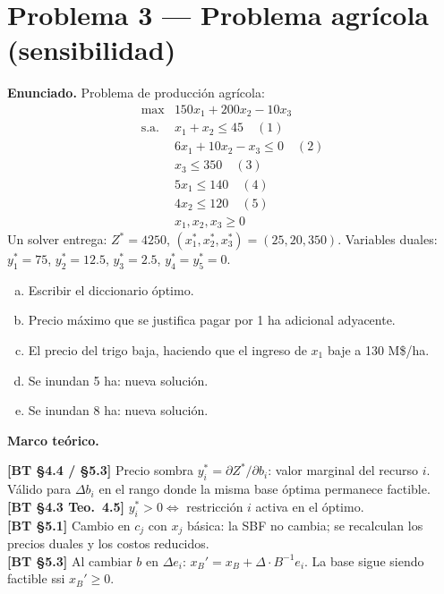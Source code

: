 \documentclass{article}
\newenvironment{marco}{\begin{mdframed}[linecolor=black!40,backgroundcolor=gray!5]\small\textbf{Marco teórico.}\par\smallskip}{\end{mdframed}\medskip}
\begin{document}
\section*{Problema 3 --- Problema agrícola (sensibilidad)}

\textbf{Enunciado.} Problema de producción agrícola:
\[
\begin{array}{ll}
\max & 150x_1 + 200x_2 - 10x_3 \\
\text{s.a.} & x_1 + x_2 \leq 45 \quad (1) \\
& 6x_1 + 10x_2 - x_3 \leq 0 \quad (2) \\
& x_3 \leq 350 \quad (3) \\
& 5x_1 \leq 140 \quad (4) \\
& 4x_2 \leq 120 \quad (5) \\
& x_1, x_2, x_3 \geq 0
\end{array}
\]
Un solver entrega: $Z^* = 4250$, $(x_1^*, x_2^*, x_3^*) = (25, 20, 350)$. Variables duales: $y_1^* = 75$, $y_2^* = 12.5$, $y_3^* = 2.5$, $y_4^* = y_5^* = 0$.
\begin{enumerate}[a)]
  \item Escribir el diccionario óptimo.
  \item Precio máximo que se justifica pagar por 1 ha adicional adyacente.
  \item El precio del trigo baja, haciendo que el ingreso de $x_1$ baje a 130 M\$/ha.
  \item Se inundan 5 ha: nueva solución.
  \item Se inundan 8 ha: nueva solución.
\end{enumerate}

\begin{marco}
\textbf{[BT §4.4 / §5.3]} Precio sombra $y_i^* = \partial Z^*/\partial b_i$: valor marginal del recurso $i$. Válido para $\Delta b_i$ en el rango donde la misma base óptima permanece factible. \\[2pt]
\textbf{[BT §4.3 Teo.\ 4.5]} $y_i^* > 0 \Leftrightarrow$ restricción $i$ activa en el óptimo. \\[2pt]
\textbf{[BT §5.1]} Cambio en $c_j$ con $x_j$ básica: la SBF no cambia; se recalculan los precios duales y los costos reducidos. \\[2pt]
\textbf{[BT §5.3]} Al cambiar $b$ en $\Delta e_i$: $x_B' = x_B + \Delta \cdot B^{-1}e_i$. La base sigue siendo factible ssi $x_B' \geq 0$.
\end{marco}
\end{document}
